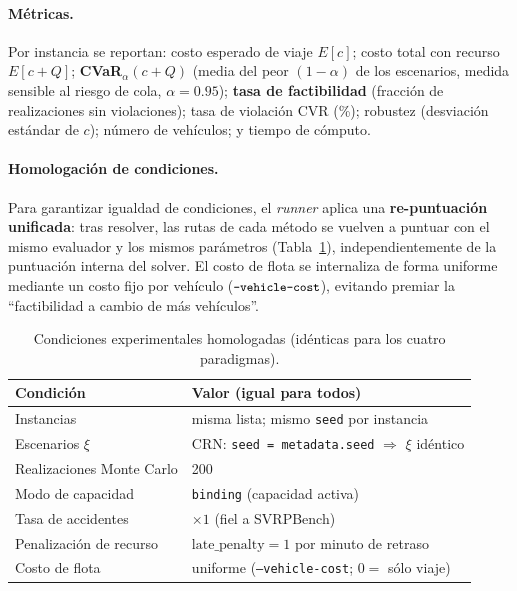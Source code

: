 \documentclass[11pt,a4paper]{article}
\newcommand{\code}[1]{\texttt{\small #1}}
\begin{document}
\paragraph{Métricas.} Por instancia se reportan: costo esperado de viaje $E[c]$; costo total
con recurso $E[c+Q]$; \textbf{CVaR}$_\alpha(c+Q)$ (media del peor $(1-\alpha)$ de los
escenarios, medida sensible al riesgo de cola, $\alpha=0.95$); \textbf{tasa de factibilidad}
(fracción de realizaciones sin violaciones); tasa de violación CVR (\%); robustez
(desviación estándar de $c$); número de vehículos; y tiempo de cómputo.

\paragraph{Homologación de condiciones.} Para garantizar igualdad de condiciones, el
\emph{runner} aplica una \textbf{re-puntuación unificada}: tras resolver, las rutas de cada
método se vuelven a puntuar con el mismo evaluador y los mismos parámetros
(Tabla~\ref{tab:cond}), independientemente de la puntuación interna del solver. El costo de
flota se internaliza de forma uniforme mediante un costo fijo por vehículo
($\code{--vehicle-cost}$), evitando premiar la ``factibilidad a cambio de más vehículos''.

\begin{table}[h]
  \centering
  \caption{Condiciones experimentales homologadas (idénticas para los cuatro paradigmas).}
  \label{tab:cond}
  \begin{tabular}{ll}
    \toprule
    \textbf{Condición} & \textbf{Valor (igual para todos)}\\
    \midrule
    Instancias & misma lista; mismo \code{seed} por instancia\\
    Escenarios $\xi$ & CRN: \code{seed = metadata.seed} $\Rightarrow$ $\xi$ idéntico\\
    Realizaciones Monte Carlo & 200\\
    Modo de capacidad & \code{binding} (capacidad activa)\\
    Tasa de accidentes & $\times 1$ (fiel a SVRPBench)\\
    Penalización de recurso & $\text{late\_penalty}=1$ por minuto de retraso\\
    Costo de flota & uniforme (\code{--vehicle-cost}; $0=$ sólo viaje)\\
    \bottomrule
  \end{tabular}
\end{table}
\end{document}
